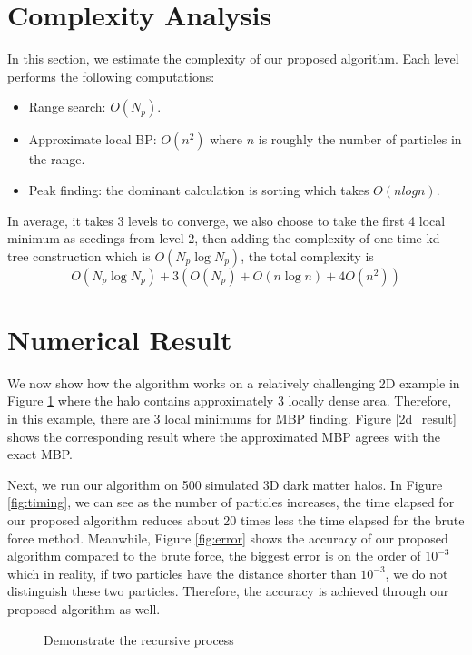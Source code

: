 \section{Complexity Analysis}
In this section, we estimate the complexity of our proposed algorithm. Each level performs the following computations:
\begin{itemize}
  \item Range search: $O(N_p)$. 
  \item Approximate local BP: $O(n^2)$ where $n$ is roughly the number of particles in the range.
  \item Peak finding: the dominant calculation is sorting which takes $O(nlogn)$. 
\end{itemize}
In average, it takes 3 levels to converge, we also choose to take the first 4 local minimum as seedings from level 2, then adding the complexity of one time kd-tree construction which is $O(N_p \log N_p)$, the total complexity is
\[\displaystyle O(N_p \log N_p)+3\left(O(N_p)+O(n\log n)+4O(n^2)\right)\] 
\section{Numerical Result}

We now show how the algorithm works on a relatively challenging 2D example in Figure \ref{illu_level} where the halo contains approximately 3 locally dense area. Therefore, in this example, there are 3 local minimums for MBP finding. Figure \ref{2d_result} shows the corresponding result where the approximated MBP agrees with the exact MBP.

Next, we run our algorithm on 500 simulated 3D dark matter halos. In Figure \ref{fig:timing}, we can see as the number of particles increases, the time elapsed for our proposed algorithm reduces about 20 times less the time elapsed for the brute force method. Meanwhile, Figure \ref{fig:error} shows the accuracy of our proposed algorithm compared to the brute force, the biggest error is on the order of $10^{-3}$ which in reality, if two particles have the distance shorter than $10^{-3}$, we do not distinguish these two particles. Therefore, the accuracy is achieved through our proposed algorithm as well.  

\begin{figure}[h]
\subfloat[ \label{fig:1st}]{
\texttt{[image: 2d\_1]}}
\hfill
\subfloat[ \label{fig:2nd}]{
\texttt{[image: 2d\_2]}}
\caption{Demonstrate the recursive process}
\label{illu_level}
\end{figure}

